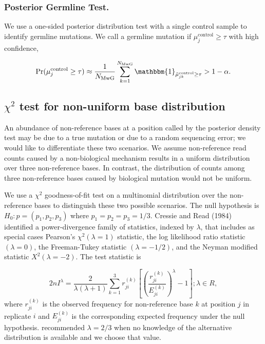 \documentclass{bioinfo}
\begin{document}
\subsubsection*{Posterior Germline Test.}

We use a one-sided posterior distribution test with a single control sample to identify germline mutations. We call a germline mutation if $ \mu_j^{\text{control}} \geq \tau$ with high confidence,

\begin{equation}\label{eqn:germ_test}
	\Pr(\mu_j^{\text{control}}  \geq \tau ) \approx \frac{1}{N_{\text{MwG}}} \sum_{k=1}^{N_{\text{MwG}}} \mathbbm{1}_{\tilde{\mu}_{jk}^{\text{control}} \geq \tau } > 1-\alpha.
\end{equation}

\subsection{$\chi^2$ test for non-uniform base distribution}

An abundance of non-reference bases at a position called by the posterior density test may be due to a true mutation or due to a random sequencing error; we would like to differentiate these two scenarios. We assume non-reference read counts caused by a non-biological mechanism results in a uniform distribution over three non-reference bases. In contrast, the distribution of counts among three non-reference bases caused by biological mutation would not be uniform.

We use a $\chi^2$ goodness-of-fit test on a multinomial distribution over the non-reference bases to distinguish these two possible scenarios. The null hypothesis is $H_0: p = (p_1, p_2, p_3)$ where $p_1=p_2=p_3=1/3$. Cressie and Read (1984) identified a power-divergence family of statistics, indexed by $\lambda$, that includes as special cases Pearson's $\chi^2 (\lambda = 1)$ statistic, the log likelihood ratio statistic $(\lambda = 0)$, the Freeman-Tukey statistic $(\lambda = -1/2)$, and the Neyman modified statistic $X^2 (\lambda = -2)$. The test statistic is

\begin{equation}
 2nI^\lambda = \frac{2}{\lambda(\lambda+1)}\sum_{k=1}^3 r_{ji}^{(k)} \left[\left(\frac{r_{ji}^{(k)}}{E_{ji}^{(k)}}\right)^\lambda-1\right];\lambda \in R,
\end{equation}
where $r_{ji}^{(k)}$ is the observed frequency for non-reference base $k$ at position $j$ in replicate $i$ and $E_{ji}^{(k)}$ is the corresponding expected frequency under the null hypothesis. \citet{cressie1984multinomial} recommended $\lambda = 2/3$ when no knowledge of the alternative distribution is available and we choose that value.
\end{document}

